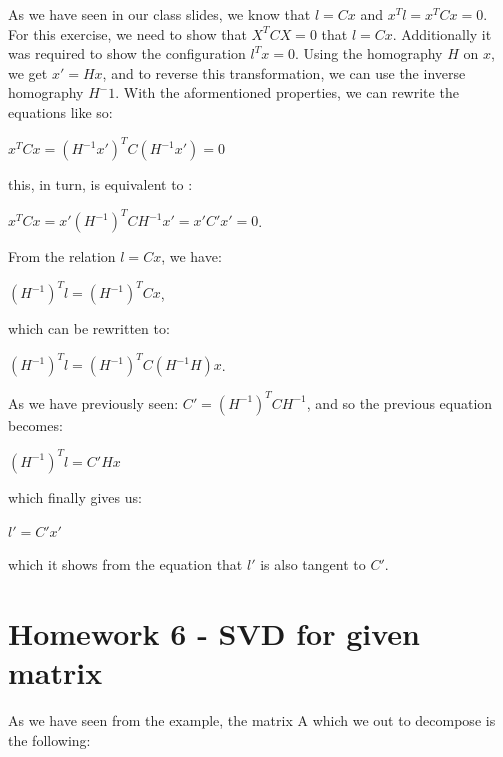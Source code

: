 \documentclass[]{article}
\begin{document}
As we have seen in our class slides, we know that $l = Cx$ and $x^Tl=x^TCx = 0$. For this exercise, we need to show that $X^TCX=0$ that $l=Cx$. Additionally it was required to show the configuration $l^Tx=0$. Using the homography $H$ on $x$, we get $x'=Hx$, and to reverse this transformation, we can use the inverse homography $H^-1$. With the aformentioned properties, we can rewrite the equations like so:

\vspace{0.5em}

\centerline {
	$x^TCx = (H^{-1}x')^TC(H^{-1}x') = 0$
}
\vspace{0.5em}

this, in turn, is equivalent to :

\vspace{0.5em}

\centerline {
	$x^TCx = x'(H^{-1})^TCH^{-1}x' = x'C'x' = 0$.
}

\vspace{0.5em}

From the relation $l = Cx$, we have:

\vspace{0.5em}

\centerline {
	$(H^{-1})^Tl = (H^{-1})^TCx$,
}

\vspace{0.5em}

which can be rewritten to:

\vspace{0.5em}

\centerline {	
	$(H^{-1})^Tl = (H^{-1})^TC(H^{-1}H)x$.
}

\vspace{0.5em}

As we have previously seen: $C' = (H^{-1})^TCH^{-1}$, and so the previous equation becomes:

\centerline {
	$(H^{-1})^Tl = C'Hx$
}

\vspace{0.5em}

which finally gives us:

\vspace{0.5em}

\centerline {
	$l' = C'x'$
}

which it shows from the equation that $l'$ is also tangent to $C'$.

\section{Homework 6 - SVD for given matrix}
As we have seen from the example, the matrix A which we out to decompose is the following: 
\end{document}
